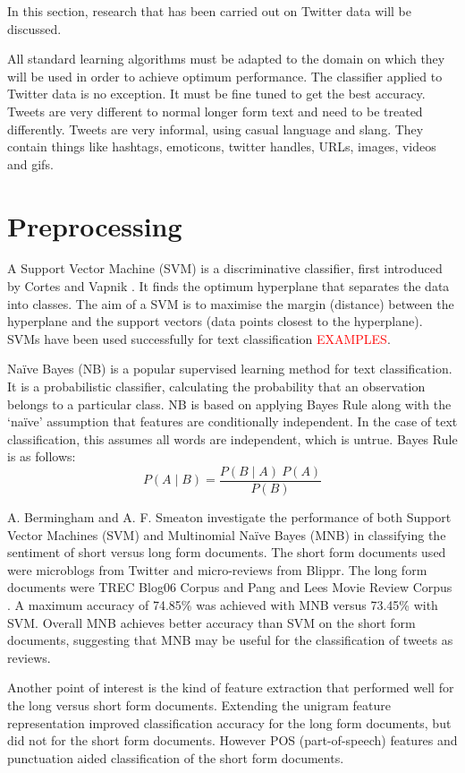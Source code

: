 In this section, research that has been carried out on Twitter data will be discussed.

All standard learning algorithms must be adapted to the domain on which they will be used in order to achieve optimum performance. The classifier applied to Twitter data is no exception. It must be fine tuned to get the best accuracy. Tweets are very different to normal longer form text and need to be treated differently. Tweets are very informal, using casual language and slang. They contain things like hashtags, emoticons, twitter handles, URLs, images, videos and gifs.

\section{Preprocessing}

A Support Vector Machine (SVM) is a discriminative classifier, first introduced by Cortes and Vapnik \cite{Vapnik1995,Vapnik21995}. It finds the optimum hyperplane that separates the data into classes. The aim of a SVM is to maximise the margin (distance) between the hyperplane and the support vectors (data points closest to the hyperplane). SVMs have been used successfully for text classification \textcolor{red}{EXAMPLES}.

Naïve Bayes (NB) is a popular supervised learning method for text classification. It is a probabilistic classifier, calculating the probability that an observation belongs to a particular class. NB is based on applying Bayes Rule along with the ‘naïve’ assumption that features are conditionally independent. In the case of text classification, this assumes all words are independent, which is untrue. Bayes Rule is as follows:  \[P(A\mid B)=\frac{P(B\mid A)\:P(A)}{P(B)}\] 

A. Bermingham and A. F. Smeaton \cite{Berm2010} investigate the performance of both Support Vector Machines (SVM) and Multinomial Naïve Bayes (MNB) in classifying the sentiment of short versus long form documents. The short form documents used were microblogs from Twitter and micro-reviews from Blippr. The long form documents were TREC Blog06 Corpus and Pang and Lees Movie Review Corpus \cite{panglee2004}. A maximum accuracy of 74.85\% was achieved with MNB versus 73.45\% with SVM. Overall MNB achieves better accuracy than SVM on the short form documents, suggesting that MNB may be useful for the classification of tweets as reviews.

Another point of interest is the kind of feature extraction that performed well for the long versus short form documents. Extending the unigram feature representation improved classification accuracy for the long form documents, but did not for the short form documents. However POS (part-of-speech) features and punctuation aided classification of the short form documents. 

